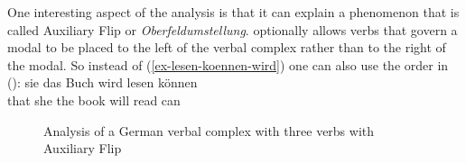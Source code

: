 One interesting aspect of the analysis is that it can explain a phenomenon that is called Auxiliary
Flip or \emph{Oberfeldumstellung}.  optionally allows verbs that govern a modal to be placed
to the left of the verbal complex rather than to the right of the modal. So instead of
(\ref{ex-lesen-koennen-wird}) one can also use the order in ():
\ea
\gll [dass] sie das Buch wird lesen können\\
     \spacebr{}that she the book will read can\\
\z
\begin{figure}
\caption{\label{fig-wird-lesen-koennen}Analysis of a German verbal complex with three verbs with
  Auxiliary Flip}
\end{figure}

